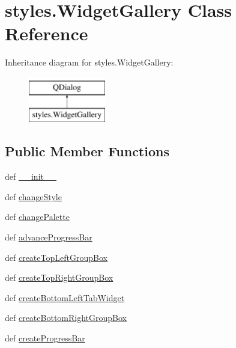 \hypertarget{classstyles_1_1WidgetGallery}{}\section{styles.\+Widget\+Gallery Class Reference}
\label{classstyles_1_1WidgetGallery}
Inheritance diagram for styles.\+Widget\+Gallery\+:\begin{figure}[H]
\begin{center}
\leavevmode
\includegraphics[height=2.000000cm]{classstyles_1_1WidgetGallery}
\end{center}
\end{figure}
\subsection*{Public Member Functions}
\begin{DoxyCompactItemize}
\item 
def \hyperlink{classstyles_1_1WidgetGallery_a6cb409ded871cffc52d12ca4ad2d3c13}{\+\_\+\+\_\+init\+\_\+\+\_\+}
\item 
def \hyperlink{classstyles_1_1WidgetGallery_acf36680604e06e324d326d1c595fdfa5}{change\+Style}
\item 
def \hyperlink{classstyles_1_1WidgetGallery_a960222b060479683bbf37d4eac55a127}{change\+Palette}
\item 
def \hyperlink{classstyles_1_1WidgetGallery_a4055acfae042b3aeb0a642acf3413dd9}{advance\+Progress\+Bar}
\item 
def \hyperlink{classstyles_1_1WidgetGallery_a681a7924a1102909d943cb9432356aff}{create\+Top\+Left\+Group\+Box}
\item 
def \hyperlink{classstyles_1_1WidgetGallery_a7150b255025cc13b89b27ac050e6d82d}{create\+Top\+Right\+Group\+Box}
\item 
def \hyperlink{classstyles_1_1WidgetGallery_ac7355cee9cd12f562a49d8cb50be7581}{create\+Bottom\+Left\+Tab\+Widget}
\item 
def \hyperlink{classstyles_1_1WidgetGallery_a6b00443c4a7590bd9fc1eabf2e0152d2}{create\+Bottom\+Right\+Group\+Box}
\item 
def \hyperlink{classstyles_1_1WidgetGallery_a7b6dfb3cbfe88819c2afbf3274e74787}{create\+Progress\+Bar}
\end{DoxyCompactItemize}
